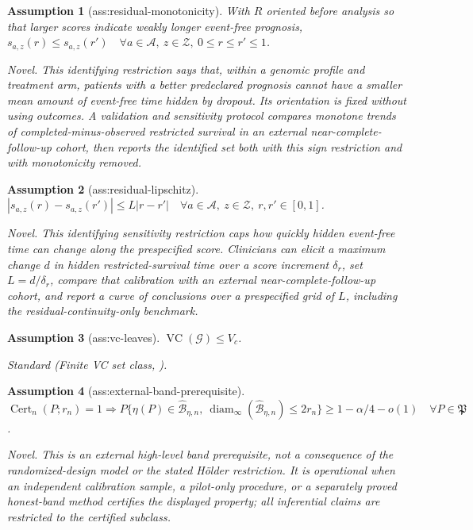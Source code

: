 \documentclass{article}
\newtheorem{assumption}{Assumption}
\begin{document}
\begin{assumption}[ass:residual-monotonicity]\label{ass:residual-monotonicity}
With \(R\) oriented before analysis so that larger scores indicate weakly longer event-free prognosis, \(s_{a,z}(r)\le s_{a,z}(r')\quad\forall a\in\mathcal A,\ z\in\mathcal Z,\ 0\le r\le r'\le1\).
\par\smallskip\noindent\emph{Novel.} This identifying restriction says that, within a genomic profile and treatment arm, patients with a better predeclared prognosis cannot have a smaller mean amount of event-free time hidden by dropout. Its orientation is fixed without using outcomes. A validation and sensitivity protocol compares monotone trends of completed-minus-observed restricted survival in an external near-complete-follow-up cohort, then reports the identified set both with this sign restriction and with monotonicity removed.
\end{assumption}

\begin{assumption}[ass:residual-lipschitz]\label{ass:residual-lipschitz}
\(|s_{a,z}(r)-s_{a,z}(r')|\le L|r-r'|\quad\forall a\in\mathcal A,\ z\in\mathcal Z,\ r,r'\in[0,1]\).
\par\smallskip\noindent\emph{Novel.} This identifying sensitivity restriction caps how quickly hidden event-free time can change along the prespecified score. Clinicians can elicit a maximum change \(d\) in hidden restricted-survival time over a score increment \(\delta_r\), set \(L=d/\delta_r\), compare that calibration with an external near-complete-follow-up cohort, and report a curve of conclusions over a prespecified grid of \(L\), including the residual-continuity-only benchmark.
\end{assumption}

\begin{assumption}[ass:vc-leaves]\label{ass:vc-leaves}
\(\operatorname{VC}(\mathcal G)\le V_c\).
\par\smallskip\noindent\emph{Standard} (Finite VC set class, \cite{vanDerVaartWellner1996}).
\end{assumption}

\begin{assumption}[ass:external-band-prerequisite]\label{ass:external-band-prerequisite}
\(\operatorname{Cert}_n(P;r_n)=1\Longrightarrow P\{\eta(P)\in\widehat{\mathcal B}_{\eta,n},\ \operatorname{diam}_\infty(\widehat{\mathcal B}_{\eta,n})\le2r_n\}\ge1-\alpha/4-o(1)\quad\forall P\in\mathfrak P\).
\par\smallskip\noindent\emph{Novel.} This is an external high-level band prerequisite, not a consequence of the randomized-design model or the stated Hölder restriction. It is operational when an independent calibration sample, a pilot-only procedure, or a separately proved honest-band method certifies the displayed property; all inferential claims are restricted to the certified subclass.
\end{assumption}
\end{document}
